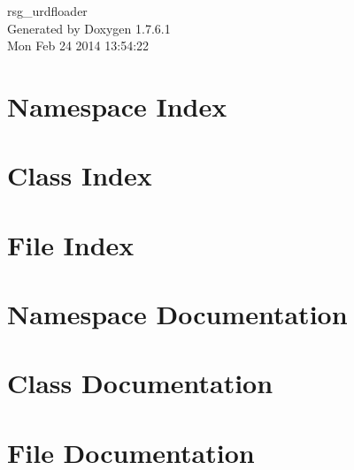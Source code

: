 \documentclass[a4paper]{book}
\begin{document}
\begin{titlepage}
\vspace*{7cm}
\begin{center}
{\Large rsg\-\_\-urdfloader }\\
\vspace*{1cm}
{\large \-Generated by Doxygen 1.7.6.1}\\
\vspace*{0.5cm}
{\small Mon Feb 24 2014 13:54:22}\\
\end{center}
\end{titlepage}
\clearemptydoublepage
{}
\tableofcontents
\clearemptydoublepage
{}
\chapter{\-Namespace \-Index}

\chapter{\-Class \-Index}

\chapter{\-File \-Index}

\chapter{\-Namespace \-Documentation}

\chapter{\-Class \-Documentation}

\chapter{\-File \-Documentation}



\printindex
\end{document}
